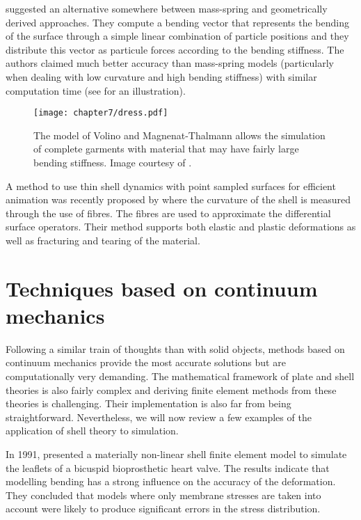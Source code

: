 \cite{Volino06} suggested an alternative somewhere between mass-spring and geometrically derived approaches. They compute a bending vector that represents the bending of the surface through  a simple linear combination of particle positions and they distribute this vector as particule forces according to the bending stiffness. The authors claimed much better accuracy than mass-spring models (particularly when dealing with low curvature and high bending stiffness) with similar computation time (see  for an illustration). 
%
\begin{figure}[ht]
\begin{center}
\texttt{[image: chapter7/dress.pdf]}
\caption[Simulation of complete garments that have large bending stiffness]{The model of Volino and Magnenat-Thalmann allows the simulation of complete garments with material that may have fairly large bending stiffness. Image courtesy of \cite{Volino06}.}
\label{chap7:fig-dress}
\end{center}
\end{figure}

A method to use thin shell dynamics with point sampled surfaces for efficient animation was recently proposed by \cite{Wicke05} where the curvature of the shell is measured through the use of fibres. The fibres are used to approximate the differential surface operators. Their method supports both elastic and plastic deformations as well as fracturing and tearing of the material. 
		

\section{Techniques based on continuum mechanics}

Following a similar train of thoughts than with solid objects, methods based on continuum mechanics provide the most accurate solutions but are computationally very demanding. The mathematical framework of plate and shell theories is also fairly complex and deriving finite element methods from these theories is challenging. Their implementation is also far from being straightforward. Nevertheless, we will now review a few examples of the application of shell theory to simulation. 

In 1991, \citeauthor{Black91} presented a materially non-linear shell finite element model to simulate the leaflets of a bicuspid bioprosthetic heart valve. The results indicate that modelling bending has a strong influence on the accuracy of the deformation. They concluded that models where only membrane stresses are taken into account were likely to produce significant errors in the stress distribution. 

